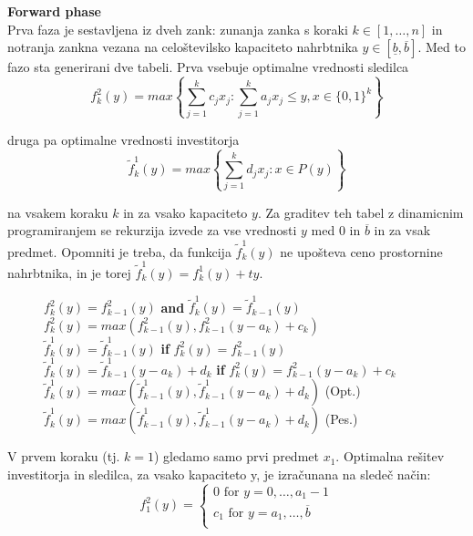 \documentclass[a4paper, 11pt]{article}
\begin{document}
	\textbf{Forward phase} \\
	Prva faza je sestavljena iz dveh zank: zunanja zanka s koraki $k \in \left[1, \dots , n \right]$ in notranja zankna vezana na celoštevilsko kapaciteto nahrbtnika $y \in \left[ \underline{b}, \overline{b} \right]$. Med to fazo sta generirani dve tabeli. Prva vsebuje optimalne vrednosti sledilca
	$$ f^{2}_{k}(y) = max \left\{ \sum_{j=1}^{k} c_j x_j : \sum_{j=1}^{k} a_j x_j \leq y, x \in \{0, 1\}^k \right\} $$
	
	druga pa optimalne vrednosti investitorja
	$$ \widetilde{f}^{1}_{k}(y) = max \left\{ \sum_{j=1}^{k} d_j x_j : x \in P(y) \right\} $$
	
	na vsakem koraku $k$ in za vsako kapaciteto $y$. Za graditev teh tabel z dinamicnim programiranjem se rekurzija izvede za vse vrednosti $y$ med $0$ in $\overline{b}$ in za vsak predmet. Opomniti je treba, da funkcija  $\widetilde{f}^{1}_{k}(y)$ ne upošteva ceno prostornine nahrbtnika, in je torej   $\widetilde{f}^{1}_{k}(y) = f^{1}_{k}(y)+ty$. \\

	\begin{figure}[ht]
  	\centering
  		\begin{minipage}{0.9\linewidth}
			\begin{algorithmic}[1]
						\STATE $f_{k}^{2}(y) = f_{k-1}^{2}(y)$ \textbf{and} $\widetilde{f}_{k}^{1}(y) = \widetilde{f}_{k-1}^{1}(y)$
					\ELSE
						\STATE $f_{k}^{2}(y) = max( f_{k-1}^{2}(y), f_{k-1}^{2}(y - a_k) + c_k)$
							\STATE $\widetilde{f}^{1}_{k}(y) = \widetilde{f}^{1}_{k-1}(y)$ \textbf{if} $f_{k}^{2}(y) = f_{k-1}^{2}(y)$
							\STATE $\widetilde{f}^{1}_{k}(y) = \widetilde{f}^{1}_{k-1}(y-a_k) + d_k$ \textbf{if} $f_{k}^{2}(y) = f_{k-1}^{2}(y - a_k) + c_k$
						\ELSE
							\STATE $\widetilde{f}^{1}_{k}(y) = max(\widetilde{f}^{1}_{k-1}(y), \widetilde{f}^{1}_{k-1}(y-a_k) + d_k)$ (Opt.)
							\STATE $\widetilde{f}^{1}_{k}(y) = max(\widetilde{f}^{1}_{k-1}(y), \widetilde{f}^{1}_{k-1}(y-a_k) + d_k)$ (Pes.)
						\ENDIF
					\ENDIF
				\ENDFOR
			\end{algorithmic}
		\end{minipage}
	\end{figure}
	
	V prvem koraku (tj. $k=1$) gledamo samo prvi predmet $x_1$. Optimalna rešitev investitorja in sledilca, za vsako kapaciteto y, je izračunana na sledeč način:
	\[   
	\text{$f_{1}^{2}(y) =$}
    	\begin{cases}
	 	\text{0 for $y = 0, \dots, a_1 - 1$} \\
       		\text{$c_1$ for $y = a_1, \dots, \overline{b}$} \\
    	\end{cases}
	\]
	
\end{document}
